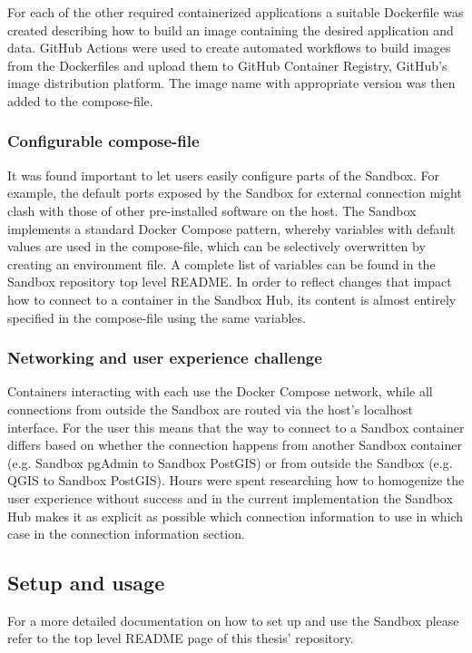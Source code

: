 \documentclass[11pt, a4paper, oneside, parskip=full-]{scrartcl}
\begin{document}
For each of the other required containerized applications a suitable Dockerfile
was created describing how to build an image containing the desired application
and data. GitHub Actions\cite{githubactions} were used to create automated
workflows to build images from the Dockerfiles and upload them to GitHub
Container Registry\cite{gcr}, GitHub's image distribution platform. The image
name with appropriate version was then added to the compose-file.

\subsubsection*{Configurable compose-file}
It was found important to let users easily configure parts of the Sandbox. For
example, the default ports exposed by the Sandbox for external connection might
clash with those of other pre-installed software on the host. The Sandbox
implements a standard Docker Compose pattern, whereby variables with default
values are used in the compose-file, which can be selectively overwritten by
creating an environment file\cite{composeenvfile}. A complete list of variables
can be found in the Sandbox repository top level README\cite{osgeostacksandbox}.
In order to reflect changes that impact how to connect to a container in the
Sandbox Hub, its content is almost entirely specified in the compose-file using
the same variables.

\subsubsection*{Networking and user experience challenge}
Containers interacting with each use the Docker Compose network, while all
connections from outside the Sandbox are routed via the host's localhost
interface. For the user this means that the way to connect to a Sandbox
container differs based on whether the connection happens from another Sandbox
container (e.g. Sandbox pgAdmin to Sandbox PostGIS) or from outside the Sandbox
(e.g. QGIS to Sandbox PostGIS). Hours were spent researching how to homogenize
the user experience without success and in the current implementation the
Sandbox Hub makes it as explicit as possible which connection information to use
in which case in the connection information section.

\subsection{Setup and usage}
For a more detailed documentation on how to set up and use the Sandbox please
refer to the top level README page of this thesis'
repository\cite{osgeostacksandbox}.
\end{document}
